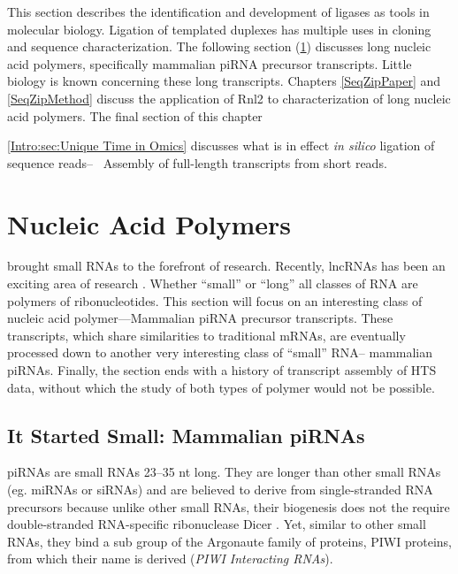     This section describes the identification and development of ligases as tools in molecular biology. Ligation of templated duplexes has multiple uses in cloning and sequence characterization. The following section (\ref{Intro:sec:Nucleic Acid Polymers}) discusses long nucleic acid polymers, specifically mammalian piRNA precursor transcripts. Little biology is known concerning these long transcripts. Chapters \ref{SeqZipPaper} and \ref{SeqZipMethod} discuss the application of Rnl2 to characterization of long nucleic acid polymers. The final section of this chapter {\ref{Intro:sec:Unique Time in Omics} discusses what is in effect \textit{in silico} ligation of sequence reads--~ Assembly of full-length transcripts from short reads.

\section{Nucleic Acid Polymers}
  \label{Intro:sec:Nucleic Acid Polymers}

  \citet{Fire1998} brought small RNAs to the forefront of research. Recently, lncRNAs has been an exciting area of research \citep{Khalil2009,Guttman2009}. Whether ``small'' or ``long'' all classes of RNA are polymers of ribonucleotides. This section will focus on an interesting class of nucleic acid polymer---Mammalian piRNA precursor transcripts. These transcripts, which share similarities to traditional mRNAs, are eventually processed down to another very interesting class of ``small'' RNA-- mammalian piRNAs. Finally, the section ends with a history of transcript assembly of HTS data, without which the study of both types of polymer would not be possible.

  \subsection{It Started Small: Mammalian piRNAs}
  
    piRNAs are small RNAs 23--35 nt long. They are longer than other small RNAs (eg. miRNAs or siRNAs) and are believed to derive from single-stranded RNA precursors because unlike other small RNAs, their biogenesis does not the require double-stranded RNA-specific ribonuclease Dicer \citep{Vagin2006, Houwing2007}. Yet, similar to other small RNAs, they bind a sub group of the Argonaute family of proteins, PIWI proteins, from which their name is derived (\textit{PIWI Interacting RNAs}). 

}

